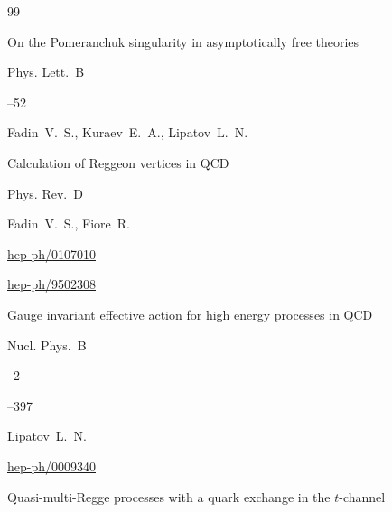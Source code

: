 \begin{thebibliography}{99}




\paper On the Pomeranchuk singularity in asymptotically free theories


\jour Phys. Lett.~B 



--52

\by Fadin~V.~S., Kuraev~E.~A., Lipatov~L.~N.





\paper Calculation of Reggeon vertices in QCD


\jour Phys. Rev.~D 



\by Fadin~V.~S., Fiore~R.


\arxiv \href{http://arxiv.org/abs/hep-ph/0107010}{hep-ph/0107010}





\arxiv \href{http://arxiv.org/abs/hep-ph/9502308}{hep-ph/9502308}

\paper Gauge invariant effective action for high energy processes in QCD


\jour Nucl. Phys.~B 


--2 

--397

\by Lipatov~L.~N.







\arxiv \href{http://arxiv.org/abs/hep-ph/0009340}{hep-ph/0009340}

\paper Quasi-multi-Regge processes with a quark exchange in the $t$-channel



\end{thebibliography}
